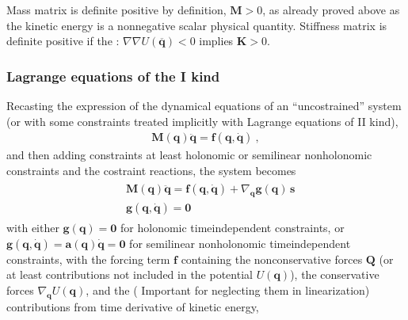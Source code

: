 \documentclass[letterpaper,10pt,english]{jupyterBook}
\begin{document}
\sphinxAtStartPar
{} Mass matrix is definite positive by definition, \(\mathbf{M} > 0\), as already proved above as the kinetic energy is a non\sphinxhyphen{}negative scalar physical quantity. Stiffness matrix is definite positive if the : \(\nabla \nabla U(\overline{\mathbf{q}}) < 0\) implies \(\mathbf{K} > 0\).

\sphinxAtStartPar
{}  


\subsubsection{Lagrange equations of the I kind}
\label{\detokenize{ch/lagrange-properties:lagrange-equations-of-the-i-kind}}\label{\detokenize{ch/lagrange-properties:classical-mechanics-lagrange-properties-lagrange-equations-i}}
\sphinxAtStartPar
Recasting the expression of the dynamical equations of an “uncostrained” system (or with some constraints treated implicitly with Lagrange equations of II kind),
\begin{equation*}
\begin{split}\mathbf{M}(\mathbf{q}) \ddot{\mathbf{q}} = \mathbf{f}(\mathbf{q}, \dot{\mathbf{q}}) \ ,\end{split}
\end{equation*}
\sphinxAtStartPar
and then adding constraints \sphinxhyphen{} at least holonomic or semi\sphinxhyphen{}linear non\sphinxhyphen{}holonomic constraints \sphinxhyphen{} and the costraint reactions, the system becomes
\begin{equation*}
\begin{split}\begin{aligned}
  & \mathbf{M}(\mathbf{q}) \ddot{\mathbf{q}} = \mathbf{f}(\mathbf{q}, \dot{\mathbf{q}}) + \nabla_\mathbf{q} \mathbf{g}(\mathbf{q}) \, \mathbf{s} \\
  & \mathbf{g}(\mathbf{q}, \dot{\mathbf{q}}) = \mathbf{0}
\end{aligned}\end{split}
\end{equation*}
\sphinxAtStartPar
with either \(\mathbf{g}(\mathbf{q}) = \mathbf{0}\) for holonomic time\sphinxhyphen{}independent constraints, or \(\mathbf{g}(\mathbf{q}, \dot{\mathbf{q}}) = \mathbf{a}(\mathbf{q}) \dot{\mathbf{q}} = \mathbf{0}\) for semi\sphinxhyphen{}linear non\sphinxhyphen{}holonomic time\sphinxhyphen{}independent constraints, with the forcing term \(\mathbf{f}\) containing the non\sphinxhyphen{}conservative forces \(\mathbf{Q}\) (or at least contributions not included in the potential \(U(\mathbf{q})\)), the conservative forces \(\nabla_{\mathbf{q}} U(\mathbf{q})\), and the ( Important for neglecting them in linearization) contributions from time derivative of kinetic energy,
\end{document}
